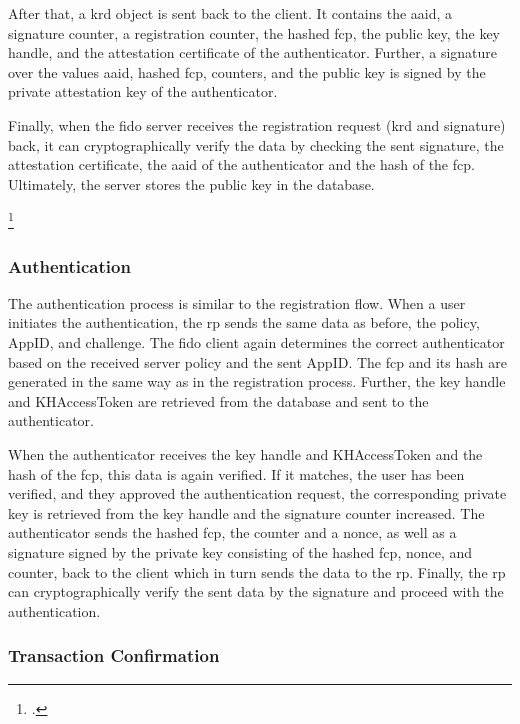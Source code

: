  After that, a \gls{krd} object is sent back to the client. It contains the \gls{aaid}, a signature counter, a registration counter, the hashed \gls{fcp}, the public key, the key handle, and the attestation certificate of the authenticator. Further, a signature over the values \gls{aaid}, hashed \gls{fcp}, counters, and the public key is signed by the private attestation key of the authenticator.

Finally, when the \gls{fido} server receives the registration request (\gls{krd} and signature) back, it can cryptographically verify the data by checking the sent signature, the attestation certificate, the \gls{aaid} of the authenticator and the hash of the \gls{fcp}. Ultimately, the server stores the public key in the database.

\footcites[See][191]{7897543}[See][131]{10.1007/978-3-319-67639-5_11}[See][]{uaf-asm}

\subsubsection{Authentication}

The authentication process is similar to the registration flow. When a user initiates the authentication, the \gls{rp} sends the same data as before, the policy, AppID, and challenge. The \gls{fido} client again determines the correct authenticator based on the received server policy and the sent AppID. The \gls{fcp} and its hash are generated in the same way as in the registration process. Further, the key handle and KHAccessToken are retrieved from the database and sent to the authenticator.

When the authenticator receives the key handle and KHAccessToken and the hash of the \gls{fcp}, this data is again verified. If it matches, the user has been verified, and they approved the authentication request, the corresponding private key is retrieved from the key handle and the signature counter increased. The authenticator sends the hashed \gls{fcp}, the counter and a \gls{nonce}, as well as a signature signed by the private key consisting of the hashed \gls{fcp}, nonce, and counter, back to the client which in turn sends the data to the \gls{rp}. Finally, the \gls{rp} can cryptographically verify the sent data by the signature and proceed with the authentication.

\subsubsection{Transaction Confirmation}

